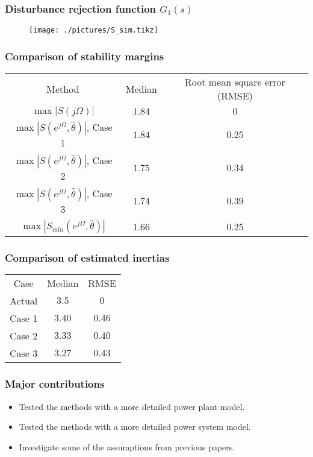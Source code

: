 \begin{frame}
		\frametitle{Disturbance rejection function $G_1(s)$}
	\begin{figure}
		\texttt{[image: ./pictures/S\_sim.tikz]}
	\end{figure}
\end{frame}
\begin{frame}
	\frametitle{Comparison of stability margins}
			\begin{tabular}{c c c}
			\toprule
			Method & Median & Root mean square error (RMSE) \\
			$\max |S(j\Omega)|$ & $1.84$ & $0$ \\
			$\max |S(e^{j\Omega},\hat{\theta})|$, Case 1 & $1.84$ & $0.25$ \\
			$\max |S(e^{j\Omega},\hat{\theta})|$, Case 2 & $1.75$ & $0.34$ \\
			$\max |S(e^{j\Omega},\hat{\theta})|$, Case 3 & $1.74$ & $0.39$ \\
			$\max |S_{\min}(e^{j\Omega},\hat{\theta})|$ & $1.66$ & $0.25$ \\
			\bottomrule
	\end{tabular}
\end{frame}
\begin{frame}
	\frametitle{Comparison of estimated inertias}
	\begin{tabular}{c c c}
			\toprule
			Case & Median & RMSE \\
			Actual & $3.5$ & $0$ \\
			Case 1& $3.40$ & $0.46$ \\
			Case 2 & $3.33$ & $0.40$ \\
			Case 3 & $3.27$ & $0.43$ \\
			\bottomrule
	\end{tabular}
\end{frame}
\begin{frame}
	\frametitle{Major contributions}
	\begin{itemize}
		\item Tested the methods with a more detailed power plant model.
		\item Tested the methods  with a more detailed power system model.
		\item Investigate some of the assumptions from previous papers.
	\end{itemize}
\end{frame}

